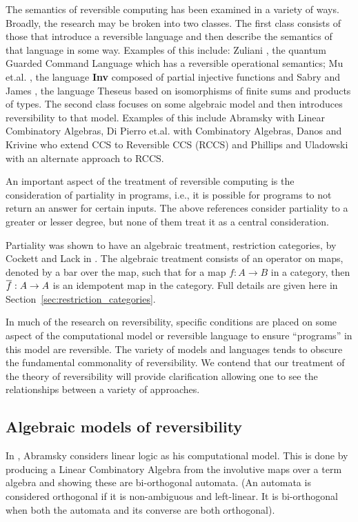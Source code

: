 The semantics of reversible computing has been examined in a variety of ways. Broadly, the research
may be broken into two classes. The first class consists of those that introduce a reversible
language and then describe the semantics of that language in some way. Examples of this include:
Zuliani \cite{zuliani01:reversibility}, the quantum Guarded Command Language which has a reversible
operational semantics; Mu et.al. \cite{muetal04:injreversible}, the language \textbf{Inv} composed
of partial injective functions and Sabry and James \cite{james2014theseus}, the language Theseus
based on isomorphisms of finite sums and products of types. The second class focuses on some
algebraic model and then introduces reversibility to that model. Examples of this include Abramsky
\cite{abramsky05:reversible} with Linear Combinatory Algebras, Di Pierro
et.al. \cite{DiPierro200625} with Combinatory Algebras, Danos and Krivine \cite{danos2004reversible}
who extend CCS\cite{milner1980calculus} to Reversible CCS (RCCS) and Phillips and Uladowski
\cite{phillips2006operational} with an alternate approach to RCCS.


An important aspect of the treatment of reversible computing is the consideration of partiality in
programs, i.e., it is possible for programs to not return an answer for certain inputs. The above
references consider partiality to a greater or lesser degree, but none of them treat it as a central
consideration.

Partiality was shown to have an algebraic treatment, restriction categories, by Cockett and Lack in
\cite{cockett2002:restcategories1,cockettlack2003:restcategories2,cockettlack2004:restcategories3}. The
algebraic treatment consists of an operator on maps, denoted by a bar over the map, such that for a
map $f:A\to B$ in a category, then $\overline{f}:A\to A$ is an idempotent map in the category. Full
details are given here in Section~\ref{sec:restriction_categories}.

In much of the research on reversibility, specific conditions are placed on some aspect of the
computational model or reversible language to ensure ``programs'' in this model are reversible.
The variety of models and languages tends to obscure the fundamental commonality of reversibility.
We contend that our treatment of the theory of reversibility will provide clarification allowing one
to see the relationships between a variety of approaches.

\subsection{Algebraic models of reversibility}
\label{subsec:algebraic_models_of_reversibility}
In \cite{abramsky05:reversible}, Abramsky considers linear logic as his computational model. This is
done by producing a Linear Combinatory Algebra \cite{abramsky02:GOI} from the involutive maps over a
term algebra and showing these are bi-orthogonal automata. (An automata is considered orthogonal if
it is non-ambiguous and left-linear. It is bi-orthogonal when both the automata and its converse are
both orthogonal).


